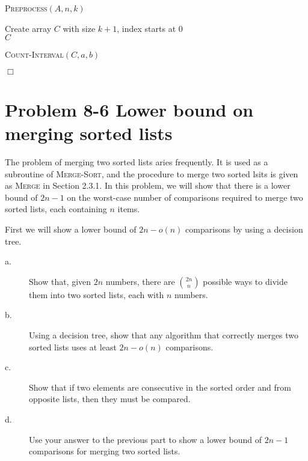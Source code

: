 \documentclass[a4paper,10pt]{article}
\newcommand{\problem}[1]{\section*{Problem #1}}
\newcommand{\qed}{\hfill \ensuremath{\Box}}
\begin{document}
\begin{algorithm}[H]
\caption{\textsc{Preprocess}$(A, n, k)$}
Create array $C$ with size $k + 1$, index starts at $0$\\
\Return $C$
\end{algorithm}

\begin{algorithm}[H]
\caption{\textsc{Count-Interval}$(C, a, b)$}
\end{algorithm}
\qed



\problem{8-6 Lower bound on merging sorted lists}

The problem of merging two sorted lists aries frequently. It is used as a subroutine of \textsc{Merge-Sort},
and the procedure to merge two sorted lsits is given as \textsc{Merge} in Section 2.3.1. In this problem,
we will show that there is a lower bound of $2n-1$ on the worst-case number of comparisons required to 
merge two sorted lists, each containing $n$ items.

First we will show a lower bound of $2n-o(n)$ comparisons by using a decision tree.

\begin{description}
\item[a. \hspace{9pt}] Show that, given $2n$ numbers, there are ${2n}\choose{n}$ possible ways to divide them into
two sorted lists, each with $n$ numbers.

\item[b. \hspace{9pt}] Using a decision tree, show that any algorithm that correctly merges two sorted lists uses at
least $2n-o(n)$ comparisons.

\item[c. \hspace{9pt}]  Show that if two elements are consecutive in the sorted order and from opposite lists,
then they must be compared.

\item[d. \hspace{9pt}] Use your answer to the previous part to show a lower bound of $2n-1$ comparisons for merging
two sorted lists.

\end{description}
\end{document}
